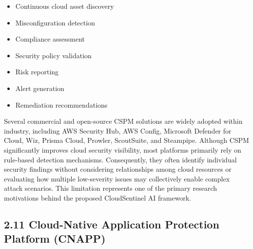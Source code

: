 \begin{itemize}
\tightlist
\item
  Continuous cloud asset discovery\\
\item
  Misconfiguration detection\\
\item
  Compliance assessment\\
\item
  Security policy validation\\
\item
  Risk reporting\\
\item
  Alert generation\\
\item
  Remediation recommendations
\end{itemize}

Several commercial and open-source CSPM solutions are widely adopted within industry, including AWS Security Hub, AWS Config, Microsoft Defender for Cloud, Wiz, Prisma Cloud, Prowler, ScoutSuite, and Steampipe. Although CSPM significantly improves cloud security visibility, most platforms primarily rely on rule-based detection mechanisms. Consequently, they often identify individual security findings without considering relationships among cloud resources or evaluating how multiple low-severity issues may collectively enable complex attack scenarios. This limitation represents one of the primary research motivations behind the proposed CloudSentinel AI framework.

\subsection{2.11 Cloud-Native Application Protection Platform (CNAPP)}

